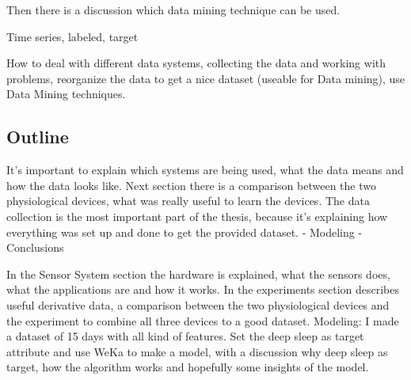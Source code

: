 		Then there is a discussion which data mining technique can be used. 


			
		Time series, labeled, target

		How to deal with different data systems, collecting the data and working with problems, reorganize the data to get a nice dataset (useable for Data mining), use Data Mining techniques.

	\subsection{Outline}
		It's important to explain which systems are being used, what the data means and how the data looks like. Next section there is a comparison between the two physiological devices, what was really useful to learn the devices. The data collection is the most important part of the thesis, because it's explaining how everything was set up and done to get the provided dataset. - Modeling - Conclusions 

		In the Sensor System section the hardware is explained, what the sensors does, what the applications are and how it works. 
		In the experiments section describes useful derivative data, a comparison between the two physiological devices and the experiment to combine all three devices to a good dataset.
		Modeling: I made a dataset of 15 days with all kind of features. Set the deep sleep as target attribute and use WeKa to make a model, with a discussion why deep sleep as target, how the algorithm works and hopefully some insights of the model. 

